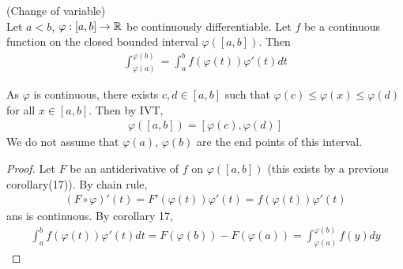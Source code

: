 \documentclass[a4paper]{article}
\begin{document}
\begin{coro} (Change of variable)\\
Let $a<b$, $\varphi:\left[a,b\right] \to \mathbb{R}$ be continuously differentiable. Let $f$ be a continuous function on the closed bounded interval $\varphi\left(\left[a,b\right]\right)$. Then
\begin{equation*}
\begin{aligned}
\int_{\varphi\left(a\right)}^{\varphi\left(b\right)} = \int_a^b f\left(\varphi\left(t\right)\right)\varphi'\left(t\right) dt
\end{aligned}
\end{equation*}

\begin{rem}
As $\varphi$ is continuous, there exists $c,d\in\left[a,b\right]$ such that $\varphi\left(c\right) \leq \varphi\left(x\right) \leq\varphi\left(d\right)$ for all $x\in\left[a,b\right]$. Then by IVT, 
\begin{equation*}
\begin{aligned}
\varphi\left(\left[a,b\right]\right) = \left[\varphi\left(c\right),\varphi\left(d\right)\right]
\end{aligned}
\end{equation*}
We do not assume that $\varphi\left(a\right)$, $\varphi\left(b\right)$ are the end points of this interval.
\end{rem}
\begin{proof}
Let $F$ be an antiderivative of $f$ on $\varphi\left(\left[a,b\right]\right)$ (this exists by a previous corollary(17)). By chain rule,
\begin{equation*}
\begin{aligned}
\left(F\circ\varphi\right)'\left(t\right) = F'\left(\varphi\left(t\right)\right)\varphi'\left(t\right) = f\left(\varphi\left(t\right)\right) \varphi'\left(t\right)
\end{aligned}
\end{equation*}
ans is continuous. By corollary 17,
\begin{equation*}
\begin{aligned}
\int_a^b f\left(\varphi\left(t\right)\right) \varphi'\left(t\right) dt = F\left(\varphi\left(b\right)\right) - F\left(\varphi\left(a\right)\right) = \int_{\varphi\left(a\right)}^{\varphi\left(b\right)} f\left(y\right) dy
\end{aligned}
\end{equation*}
\end{proof}
\end{coro}
\end{document}
